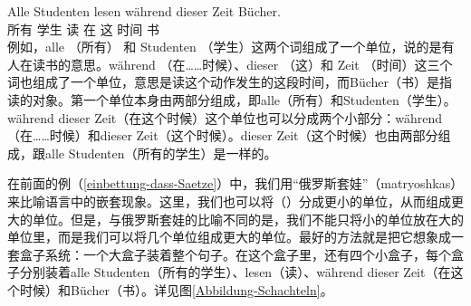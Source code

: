 \ea
\label{Beispiel-Alle-Studenten-lesen}
\gll Alle Studenten lesen während dieser Zeit Bücher.\\
     所有  学生  读  在 这  时间 书\\
\z
例如，alle （所有） 和 Studenten （学生）这两个词组成了一个单位，说的是有人在读书的意思。während （在……时候）、dieser （这）和 Zeit （时间）这三个词也组成了一个单位，意思是读这个动作发生的这段时间，而Bücher（书）是指读的对象。第一个单位本身由两部分组成，即alle（所有）和Studenten（学生）。während dieser Zeit（在这个时候）这个单位也可以分成两个小部分：während（在……时候）和dieser Zeit（这个时候）。dieser Zeit（这个时候）也由两部分组成，跟alle Studenten（所有的学生）是一样的。

在前面的例（\ref{einbettung-dass-Saetze}）中，我们用“俄罗斯套娃”（matryoshkas）来比喻语言中的嵌套现象。这里，我们也可以将（）分成更小的单位，从而组成更大的单位。但是，与俄罗斯套娃的比喻不同的是，我们不能只将小的单位放在大的单位里，而是我们可以将几个单位组成更大的单位。最好的方法就是把它想象成一套盒子系统：一个大盒子装着整个句子。在这个盒子里，还有四个小盒子，每个盒子分别装着alle Studenten（所有的学生）、lesen（读）、während dieser Zeit（在这个时候）和Bücher（书）。详见图\vref{Abbildung-Schachteln}。

